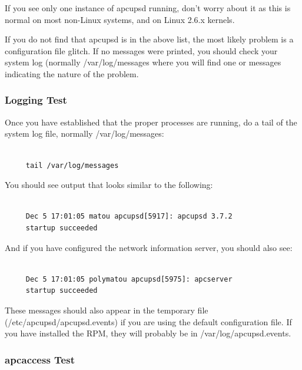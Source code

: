 {If you see only one instance of apcupsd running, don't worry about it as this
is normal on most non-Linux systems, and on Linux 2.6.x kernels.  

If you do not find that apcupsd is in the above list, the most likely problem
is a configuration file glitch.  If no messages were printed, you should check
your system log (normally /var/log/messages where you will find one or
messages indicating the nature of the problem. 

\label{Logging-Test}

\subsubsection*{Logging Test}

\label{index-Testing_002c-Logging-87}
\label{index-Logging_002c-Testing-88}
Once you have established that the proper processes are running, do a tail of
the system log file, normally /var/log/messages: 

\footnotesize
\begin{verbatim}
     
     tail /var/log/messages
\end{verbatim}
\normalsize

You should see output that looks similar to the following: 

\footnotesize
\begin{verbatim}
     
     Dec 5 17:01:05 matou apcupsd[5917]: apcupsd 3.7.2
     startup succeeded
\end{verbatim}
\normalsize

And if you have configured the network information server, you should also
see: 

\footnotesize
\begin{verbatim}
     
     Dec 5 17:01:05 polymatou apcupsd[5975]: apcserver
     startup succeeded
\end{verbatim}
\normalsize

These messages should also appear in the temporary file
(/etc/apcupsd/apcupsd.events) if you are using the default configuration file.
If you have installed the RPM, they will probably be in
/var/log/apcupsd.events. 

\label{apcaccess-Test}

\subsubsection*{apcaccess Test}

}

